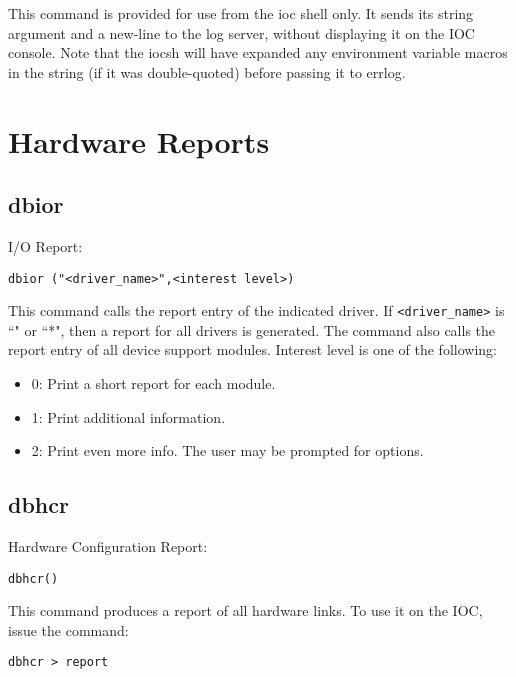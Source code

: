 This command is provided for use from the ioc shell only.  It sends its string argument and a new-line to the log server, 
without displaying it on the IOC console. Note that the iocsh will have expanded any environment variable macros in the 
string (if it was double-quoted) before passing it to errlog.

\section{Hardware Reports}

\subsection{dbior}

I/O Report:

\begin{verbatim}
dbior ("<driver_name>",<interest level>)
\end{verbatim}

This command calls the report entry of the indicated driver. If \verb|<driver_name>| is ``" or ``*", then a report for all drivers 
is generated. The command also calls the report entry of all device support modules. Interest level is one of the following:

\begin{itemize}
\item 0: Print a short report for each module.

\item 1:  Print additional information.

\item 2:  Print even more info. The user may be prompted for options.

\end{itemize}

\subsection{dbhcr}

Hardware Configuration Report:

\begin{verbatim}
dbhcr()
\end{verbatim}

This command produces a report of all hardware links. To use it on the IOC, issue the command:

\begin{verbatim}
dbhcr > report
\end{verbatim}

